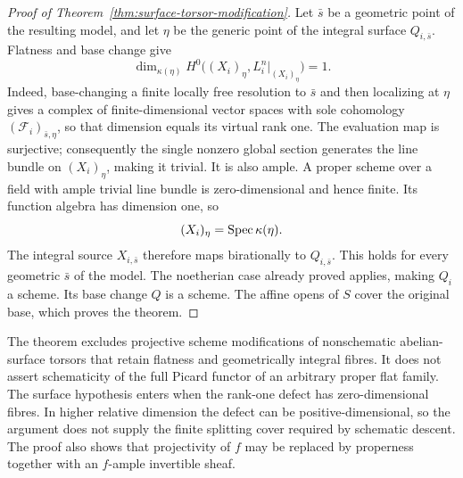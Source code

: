 \begin{proof}[Proof of Theorem~\ref{thm:surface-torsor-modification}]
Let $\bar s$ be a geometric point of the resulting model, and let
$\eta$ be the generic point of the integral surface $Q_{i,\bar s}$.
Flatness and base change give
\[
 \dim_{\kappa(\eta)}
 H^0\bigl((X_i)_\eta,L_i^n|_{(X_i)_\eta}\bigr)=1.
\]
Indeed, base-changing a finite locally free resolution to $\bar s$
and then localizing at $\eta$ gives a complex of finite-dimensional
vector spaces with sole cohomology $(\mathcal F_i)_{\bar s,\eta}$,
so that dimension equals its virtual rank one.
The evaluation map is surjective; consequently the single nonzero
global section generates the line bundle on $(X_i)_\eta$, making
it trivial. It is also ample. A proper scheme over a field with
ample trivial line bundle is zero-dimensional and hence finite.
Its function algebra has dimension one, so
\[
 (X_i)_\eta=\operatorname{Spec}\kappa(\eta).
\]
The integral source $X_{i,\bar s}$ therefore maps birationally to
$Q_{i,\bar s}$. This holds for every geometric $\bar s$ of the
model. The noetherian case already proved applies, making $Q_i$ a
scheme. Its base change $Q$ is a scheme. The affine opens of $S$
cover the original base, which proves the theorem.
\end{proof}

\begin{remark}\label{rem:surface-modification-scope}
The theorem excludes projective scheme modifications of nonschematic
abelian-surface torsors that retain flatness and geometrically integral
fibres. It does not assert schematicity of the full Picard functor of
an arbitrary proper flat family. The surface hypothesis enters when
the rank-one defect has zero-dimensional fibres. In higher relative
dimension the defect can be positive-dimensional, so the argument
does not supply the finite splitting cover required by schematic
descent. The proof also shows that projectivity of $f$ may be replaced
by properness together with an $f$-ample invertible sheaf.
\end{remark}

